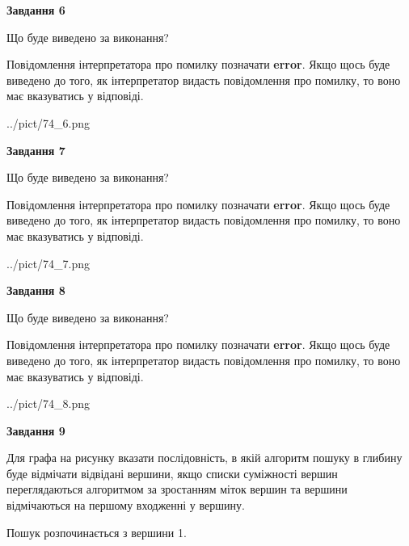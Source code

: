 \documentclass[12pt, ukrainian]{article}
\begin{document}
{\begin {large}
{\begin {center}\textbf{Завдання 6}\end {center}}\par
Що буде виведено за виконання?

Повідомлення інтерпретатора про помилку позначати \textbf{error}.
Якщо щось буде виведено до того, як інтерпретатор видасть повідомлення про помилку, 
то воно має вказуватись у відповіді. \par


\begin{center}
	{../pict/74_6.png}
\end{center}
\newpage

{\begin {center}\textbf{Завдання 7}\end {center}}\par
Що буде виведено за виконання?

Повідомлення інтерпретатора про помилку позначати \textbf{error}.
Якщо щось буде виведено до того, як інтерпретатор видасть повідомлення про помилку, 
то воно має вказуватись у відповіді. \par


\begin{center}
	{../pict/74_7.png}
\end{center}
\newpage

{\begin {center}\textbf{Завдання 8}\end {center}}\par
Що буде виведено за виконання?

Повідомлення інтерпретатора про помилку позначати \textbf{error}.
Якщо щось буде виведено до того, як інтерпретатор видасть повідомлення про помилку, 
то воно має вказуватись у відповіді. \par


\begin{center}
	{../pict/74_8.png}
\end{center}
\newpage

{\begin {center}\textbf{Завдання 9}\end {center}}\par
Для графа на рисунку вказати послідовність, в якій алгоритм пошуку в глибину буде відмічати відвідані вершини, якщо списки суміжності вершин переглядаються алгоритмом за зростанням міток вершин та вершини відмічаються на першому вход\-женні у вершину.\par
Пошук розпочинається з вершини 1.\par


\end{large}}
\end{document}
